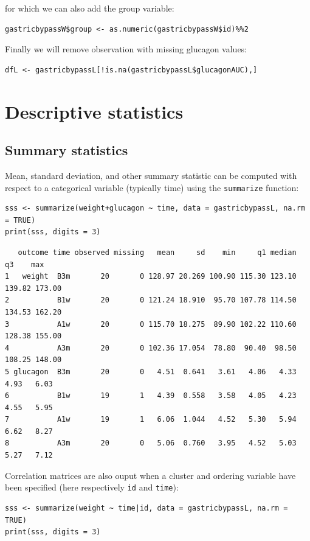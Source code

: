 \documentclass[12pt]{article}
\begin{document}
for which we can also add the group variable:
\lstset{language=r,label= ,caption= ,captionpos=b,numbers=none}
\begin{lstlisting}
gastricbypassW$group <- as.numeric(gastricbypassW$id)%%2
\end{lstlisting}

Finally we will remove observation with missing glucagon values:
\lstset{language=r,label= ,caption= ,captionpos=b,numbers=none}
\begin{lstlisting}
dfL <- gastricbypassL[!is.na(gastricbypassL$glucagonAUC),]
\end{lstlisting}

\clearpage

\section{Descriptive statistics}
\label{sec:orgc3db9b0}
\subsection{Summary statistics}
\label{sec:orgbcd7df7}

Mean, standard deviation, and other summary statistic can be computed
with respect to a categorical variable (typically time) using the
\texttt{summarize} function:
\lstset{language=r,label= ,caption= ,captionpos=b,numbers=none}
\begin{lstlisting}
sss <- summarize(weight+glucagon ~ time, data = gastricbypassL, na.rm = TRUE)
print(sss, digits = 3)
\end{lstlisting}

\begin{verbatim}
   outcome time observed missing   mean     sd    min     q1 median     q3    max
1   weight  B3m       20       0 128.97 20.269 100.90 115.30 123.10 139.82 173.00
2           B1w       20       0 121.24 18.910  95.70 107.78 114.50 134.53 162.20
3           A1w       20       0 115.70 18.275  89.90 102.22 110.60 128.38 155.00
4           A3m       20       0 102.36 17.054  78.80  90.40  98.50 108.25 148.00
5 glucagon  B3m       20       0   4.51  0.641   3.61   4.06   4.33   4.93   6.03
6           B1w       19       1   4.39  0.558   3.58   4.05   4.23   4.55   5.95
7           A1w       19       1   6.06  1.044   4.52   5.30   5.94   6.62   8.27
8           A3m       20       0   5.06  0.760   3.95   4.52   5.03   5.27   7.12
\end{verbatim}


Correlation matrices are also ouput when a cluster and ordering
variable have been specified (here respectively \texttt{id} and \texttt{time}):
\lstset{language=r,label= ,caption= ,captionpos=b,numbers=none}
\begin{lstlisting}
sss <- summarize(weight ~ time|id, data = gastricbypassL, na.rm = TRUE)
print(sss, digits = 3)
\end{lstlisting}
\end{document}
